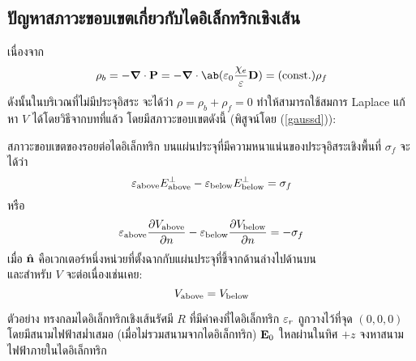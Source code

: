 \subsection{ปัญหาสภาวะขอบเขตเกี่ยวกับไดอิเล็กทริกเชิงเส้น}
เนื่องจาก
\[
\rho_b=-\gd\cdot\vb{P}=-\gd\cdot\ab(\eps_0\frac{\chi_e}{\eps}\vb{D})=(\cst)\rho_f
\]
ดังนั้นในบริเวณที่ไม่มีประจุอิสระ จะได้ว่า $\rho=\rho_b+\rho_f=0$ ทำให้สามารถใช้สมการ Laplace แก้หา $V$ ได้โดยวิธีจากบทที่แล้ว โดยมีสภาวะขอบเขตดังนี้ (พิสูจน์โดย (\ref{gaussd})):
\begin{lawbox}{สภาวะขอบเขตของรอยต่อไดอิเล็กทริก}
    บนแผ่นประจุที่มีความหนาแน่นของประจุอิสระเชิงพื้นที่ $\sigma_f$ จะได้ว่า
\begin{equation}
    \varepsilon_{\mathrm{above}}E^\perp_{\mathrm{above}}-\varepsilon_{\mathrm{below}}E^\perp_{\mathrm{below}}=\sigma_f\label{dbound1}
\end{equation}
หรือ
\begin{equation}
    \varepsilon_{\mathrm{above}}\pdv{V_{\mathrm{above}}}{n}-\varepsilon_{\mathrm{below}}\pdv{V_{\mathrm{below}}}{n}=-\sigma_f\label{dbound2}
\end{equation}
เมื่อ $\hat{\mathbf{n}}$ คือเวกเตอร์หนึ่งหน่วยที่ตั้งฉากกับแผ่นประจุที่ชี้จากด้านล่างไปด้านบน\\
และสำหรับ $V$ จะต่อเนื่องเช่นเคย:
\begin{equation}
    V_{\mathrm{above}}=V_{\mathrm{below}}
\end{equation}
\end{lawbox}
\begin{corbox}{ตัวอย่าง}
    ทรงกลมไดอิเล็กทริกเชิงเส้นรัศมี $R$ ที่มีค่าคงที่ไดอิเล็กทริก $\varepsilon_r$ ถูกวางไว้ที่จุด $(0,0,0)$ โดยมีสนามไฟฟ้าสม่ำเสมอ (เมื่อไม่รวมสนามจากไดอิเล็กทริก) $\mathbf{E}_0$ ใหลผ่านในทิศ $+z$ จงหาสนามไฟฟ้าภายในไดอิเล็กทริก
\end{corbox}
